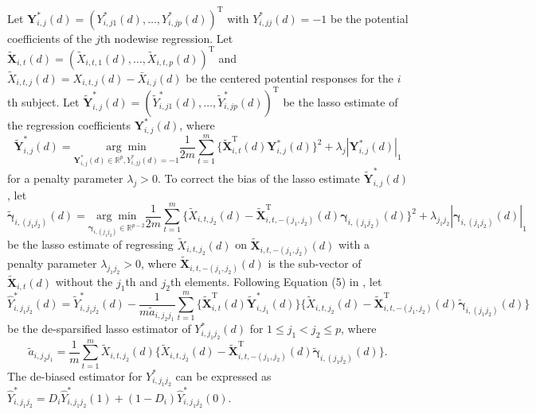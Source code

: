 \documentclass[12pt]{article}
\numberwithin{equation}{section}
\def\T{{ \mathrm{\scriptscriptstyle T} }}
\newcommand{\bX}{{\mathbf X}}
\newcommand{\bY}{{\mathbf Y}}
\newcommand{\bgamma}{\boldsymbol{\gamma}}
\begin{document}
Let $\bY_{i, j}^{\ast}(d) = (Y_{i, j 1}^{\ast}(d), \ldots, Y
_{i, j p}^{\ast}(d))^{\T}$ with $Y_{i, j j}^{\ast}(d) = -1$ be the potential coefficients of the $j$th nodewise regression.
Let $\tilde{\bX}_{i, t}(d) = (\tilde{X}_{i, t, 1}(d), \ldots, \tilde{X}_{i, t, p}(d))^{\T}$ and $\tilde{X}_{i, t, j}(d) = X_{i, t, j}(d) - \bar{X}_{i, j}(d)$ be the centered potential responses for the $i$th subject. Let $\tilde{\bY}_{i, j}^{\ast}(d) = (\tilde{Y}_{i, j 1}^{\ast}(d), \ldots, \tilde{Y}
_{i, j p}^{\ast}(d))^{\T}$ be the lasso estimate of the regression coefficients $\bY_{i, j}^{\ast}(d)$, where
$$\tilde{\bY}_{i, j}^{\ast}(d) = \underset{{\bY}_{i, j}^{\ast}(d) \in \mathbb{R}^{p}, {Y}_{i, j j}^{\ast}(d) = -1}{\arg\min} \frac{1}{2m} \sum_{t = 1}^{m}\{ \tilde{\bX}_{i, t}^{\T}(d) {\bY}_{i, j}^{\ast}(d) \}^{2}  + \lambda_{j} |{\bY}_{i, j}^{\ast}(d)|_1 $$
for a penalty parameter $\lambda_{j} > 0$.
To correct the bias of the lasso estimate $\tilde{\bY}_{i, j}^{\ast}(d)$, let
$$\tilde{\bgamma}_{i, (j_1j_2)}(d) = \underset{\bgamma_{i, (j_1j_2)} \in \mathbb{R}^{p - 2}}{\arg\min} \frac{1}{2m} \sum_{t = 1}^{m} \{\tilde{X}_{i, t, j_2}(d) - \tilde{\bX}_{i, t, -(j_1, j_2)}^{\T}(d) \bgamma_{i, (j_1j_2)}(d) \}^{2} + \lambda_{j_1j_2} | \bgamma_{i, (j_1j_2)}(d)|_{1}$$
be the lasso estimate of regressing $\tilde{X}_{i, t, j_2}(d)$ on $\tilde{\bX}_{i, t, -(j_1, j_2)}(d)$ with a penalty parameter $\lambda_{j_1j_2} > 0$, where $\tilde{\bX}_{i, t, -(j_1, j_2)}(d)$ is the sub-vector of $\tilde{\bX}_{i, t}(d)$ without the $j_1$th and $j_2$th elements.
Following Equation (5) in \cite{vanderGeerRitov2014}, let 
$$\hat{Y}_{i, j_1 j_2}^{\ast}(d) = \tilde{Y}_{i, j_1 j_2}^{\ast}(d) - \frac{1}{m \tilde{a}_{i, j_2j_1}}\sum_{t = 1}^{m}\{\tilde{\bX}_{i, t}^{\T}(d) \tilde{\bY}_{i, j_1}^{\ast}(d)\}\{\tilde{X}_{i, t, j_2}(d) - \tilde{\bX}_{i, t, -(j_1, j_2)}^{\T}(d)\tilde{\bgamma}_{i, (j_1j_2)}(d) \} $$
be the de-sparsified lasso estimator of ${Y}_{i, j_1 j_2}^{\ast}(d)$ for $1 \leq j_1 < j_2 \leq p$, where $$\tilde{a}_{i, j_2j_1} = \frac{1}{m}\sum_{t  = 1}^{m} \tilde{X}_{i, t, j_2}(d) \{\tilde{X}_{i, t, j_2}(d) - \tilde{\bX}_{i, t, -(j_1, j_2)}^{\T}(d)\tilde{\bgamma}_{i, (j_1j_2)}(d) \}.$$
The de-biased estimator for $Y_{i, j_1 j_2}^{\ast}$ can be expressed as $\hat{Y}_{i, j_1 j_2}^{\ast} = D_i \hat{Y}_{i, j_1 j_2}^{\ast}(1) + (1 - D_i) \hat{Y}_{i, j_1 j_2}^{\ast}(0)$.
\end{document}
